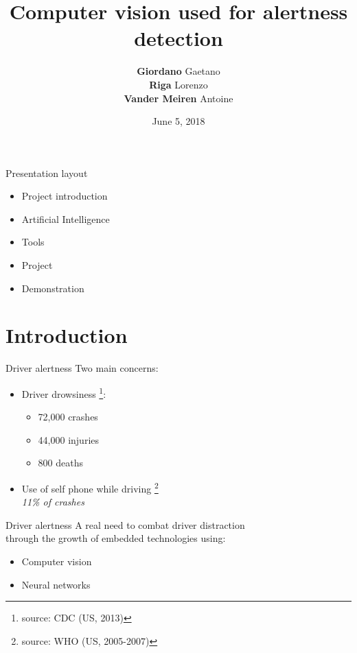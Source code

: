 \documentclass{beamer}
\title{Computer vision used for alertness detection}
\author{\textbf{Giordano} Gaetano \\ \textbf{Riga} Lorenzo \\ \textbf{Vander Meiren} Antoine \\}
\date{June 5, 2018}
\institute{ECAM Brussels}
\begin{document}
\maketitle
\begin{frame}{Presentation layout}
    \begin{itemize}
        \item Project introduction
        \item Artificial Intelligence
        \item Tools
        \item Project
        \item Demonstration
    \end{itemize}
\end{frame}
\section{Introduction}
\begin{frame}{Driver alertness}
Two main concerns:
	\begin{itemize}
        \item Driver drowsiness \footnote{source: CDC (US, 2013) }:
    \begin{itemize}
        \item 72,000 crashes
        \item 44,000 injuries
        \item 800 deaths
    \end{itemize}
    \item Use of self phone while driving \footnote{source: WHO (US, 2005-2007)} \\
        \hspace{0.27cm} \textit{11\% of crashes}
	\end{itemize}
\end{frame}

\begin{frame}{Driver alertness}
A real need to combat driver distraction \\
through the growth of embedded technologies using:
    \begin{itemize}
    \item Computer vision
    \item Neural networks
    \end{itemize}
\end{frame}
\end{document}

